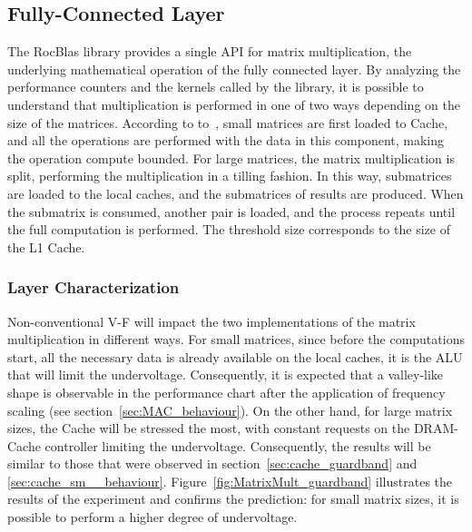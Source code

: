 \subsection{Fully-Connected Layer}


The RocBlas library provides a single API for matrix multiplication, the underlying mathematical operation of the fully connected layer. By analyzing the performance counters and the kernels called by the library, it is possible to understand that multiplication is performed in one of two ways depending on the size of the matrices.
According to to~\cite{dutot_high-performance_2016}, small matrices are first loaded to Cache, and all the operations are performed with the data in this component, making the operation compute bounded. For large matrices, the matrix multiplication is split, performing the multiplication in a tilling fashion. In this way, submatrices are loaded to the local caches, and the submatrices of results are produced. When the submatrix is consumed, another pair is loaded, and the process repeats until the full computation is performed. The threshold size corresponds to the size of the L1 Cache. 


\subsubsection{Layer Characterization}

Non-conventional V-F will impact the two implementations of the matrix multiplication in different ways. For small matrices, 
since before the computations start, all the necessary data is already available on the local caches, 
it is the ALU that will limit the undervoltage. Consequently, it is expected that a valley-like shape is observable in the performance chart after the application of frequency scaling (see section~\ref{sec:MAC_behaviour}). On the other hand, for large matrix sizes, the Cache will be stressed the most, with constant requests on the DRAM-Cache controller limiting the undervoltage. Consequently, the results will be similar to those that were observed in section~\ref{sec:cache_guardband} and \ref{sec:cache_sm__behaviour}. Figure~\ref{fig:MatrixMult_guardband} illustrates the results of the experiment and confirms the prediction: for small matrix sizes, it is possible to perform a higher degree of undervoltage. 


